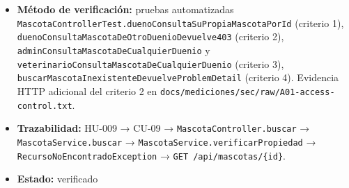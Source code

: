 \documentclass[
  spanish,
]{article}
\providecommand{\tightlist}{%
  \setlength{\itemsep}{0pt}\setlength{\parskip}{0pt}}
\begin{document}
\begin{itemize}
  \begin{enumerate}
  \def\labelenumi{\arabic{enumi}.}
  \tightlist
  \item
    Dado un \texttt{ROLE\_\allowbreak{}DUENO} y una mascota de su propiedad, cuando
    invoca \texttt{GET\ /\allowbreak{}api/\allowbreak{}mascotas/\allowbreak{}\{id\}}, entonces la respuesta es
    \texttt{200\ OK} con el detalle de esa mascota.
  \item
    Dado un \texttt{ROLE\_\allowbreak{}DUENO} y una mascota de otro dueño, entonces
    la respuesta es \texttt{403} con \texttt{Problem\allowbreak{}Detail} de tipo
    \texttt{urn:biopet:error:\allowbreak{}forbidden}.
  \item
    Dado un \texttt{ROLE\_\allowbreak{}ADMIN} o un \texttt{ROLE\_\allowbreak{}VETERINARIO},
    entonces puede consultar la mascota de cualquier dueño con
    \texttt{200\ OK}.
  \item
    Dado un identificador inexistente o de una mascota inactiva,
    entonces la respuesta es \texttt{404} con \texttt{Problem\allowbreak{}Detail} de
    tipo \texttt{urn:biopet:error:\allowbreak{}not-\allowbreak{}found}.
  \end{enumerate}
\item
  \textbf{Método de verificación:} pruebas automatizadas
  \texttt{Mascota\allowbreak{}Controller\allowbreak{}Test.\allowbreak{}dueno\allowbreak{}Consulta\allowbreak{}Su\allowbreak{}Propia\allowbreak{}Mascota\allowbreak{}Por\allowbreak{}Id}
  (criterio 1), \texttt{dueno\allowbreak{}Consulta\allowbreak{}Mascota\allowbreak{}De\allowbreak{}Otro\allowbreak{}Duenio\allowbreak{}Devuelve403}
  (criterio 2), \texttt{admin\allowbreak{}Consulta\allowbreak{}Mascota\allowbreak{}De\allowbreak{}Cualquier\allowbreak{}Duenio} y
  \texttt{veterinario\allowbreak{}Consulta\allowbreak{}Mascota\allowbreak{}De\allowbreak{}Cualquier\allowbreak{}Duenio} (criterio 3),
  \texttt{buscar\allowbreak{}Mascota\allowbreak{}Inexistente\allowbreak{}Devuelve\allowbreak{}Problem\allowbreak{}Detail} (criterio 4).
  Evidencia HTTP adicional del criterio 2 en
  \texttt{docs/\allowbreak{}mediciones/\allowbreak{}sec/\allowbreak{}raw/\allowbreak{}A01-\allowbreak{}access-\allowbreak{}control.\allowbreak{}txt}.
\item
  \textbf{Trazabilidad:} HU-009 → CU-09 →
  \texttt{Mascota\allowbreak{}Controller.\allowbreak{}buscar} → \texttt{Mascota\allowbreak{}Service.\allowbreak{}buscar} →
  \texttt{Mascota\allowbreak{}Service.\allowbreak{}verificar\allowbreak{}Propiedad} →
  \texttt{Recurso\allowbreak{}No\allowbreak{}Encontrado\allowbreak{}Exception} →
  \texttt{GET\ /\allowbreak{}api/\allowbreak{}mascotas/\allowbreak{}\{id\}}.
\item
  \textbf{Estado:} verificado
\end{itemize}
\end{document}
